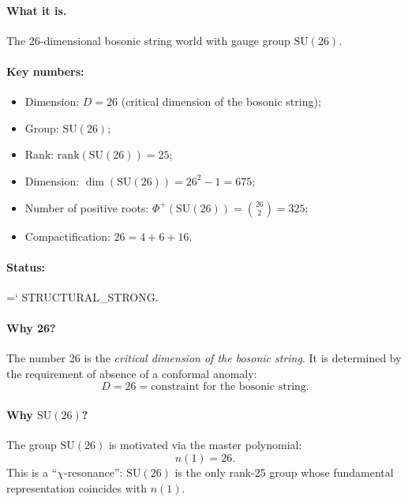 \documentclass[11pt,a4paper]{article}
\newcommand{\SU}{\mathrm{SU}}
\renewcommand{\texttt}[1]{{\ttfamily\hyphenchar\font=`\- #1}}
\theoremstyle{definition}
\begin{document}
\paragraph{What it is.}
The 26-dimensional bosonic string world with gauge group $\SU(26)$.

\paragraph{Key numbers:}
\begin{itemize}
    \item Dimension: $D = 26$ (critical dimension 
          of the bosonic string);
    \item Group: $\SU(26)$;
    \item Rank: $\mathrm{rank}(\SU(26)) = 25$;
    \item Dimension: $\dim(\SU(26)) = 26^2 - 1 = 675$;
    \item Number of positive roots: 
          $\Phi^+(\SU(26)) = \binom{26}{2} = 325$;
    \item Compactification: $26 = 4 + 6 + 16$.
\end{itemize}

\paragraph{Status:} \texttt{STRUCTURAL\_STRONG}.

\paragraph{Why 26?}
The number 26 is the \emph{critical dimension of the bosonic string}. It 
is determined by the requirement of absence of a conformal anomaly:
\begin{equation}
    D = 26 = \text{constraint for the bosonic string}.
\end{equation}

\paragraph{Why $\SU(26)$?}
The group $\SU(26)$ is motivated via the master polynomial:
\begin{equation}
    n(1) = 26.
\end{equation}
This is a ``$\chi$-resonance'': $\SU(26)$ is the only rank-25 group 
whose fundamental representation coincides with $n(1)$.

\end{document}
